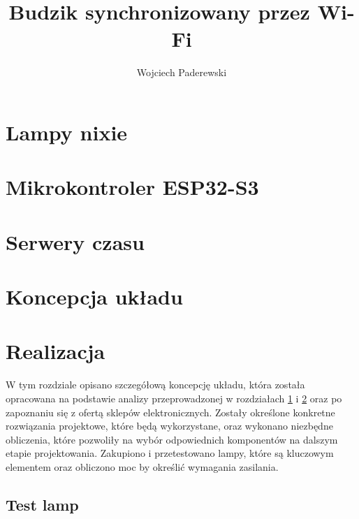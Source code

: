 \documentclass[twoside]{article}
\title{Budzik synchronizowany przez Wi-Fi}
\author{Wojciech Paderewski}
\numberwithin{equation}{section}
\begin{document}

\thispagestyle{empty}
\cleardoublepage


\cleardoublepage

\tableofcontents
\newpage

\cleardoublepage


\newpage

\section{Lampy nixie}

\label{sec:nixie}
\newpage


\section{Mikrokontroler ESP32-S3}
\label{sec:esp32}

\newpage


\section{Serwery czasu}
\label{sec:serwery_czasu}

\newpage


\newpage

\section{Koncepcja układu}

\newpage

\section{Realizacja}
\label{sec:realizacja}
W tym rozdziale opisano szczegółową koncepcję układu, która została opracowana na podstawie analizy przeprowadzonej w rozdziałach \ref{sec:nixie} i \ref{sec:esp32} 
oraz po zapoznaniu się z ofertą sklepów elektronicznych.
Zostały określone konkretne rozwiązania projektowe, które będą wykorzystane, oraz wykonano niezbędne obliczenia,
które pozwoliły na wybór odpowiednich komponentów na dalszym etapie projektowania.
Zakupiono i przetestowano lampy, które są kluczowym elementem oraz obliczono moc by określić wymagania zasilania.
\subsection{Test lamp}

\newpage
\end{document}
